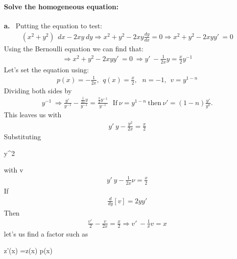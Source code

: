 



 \begin{enumerate}
  \textbf{Solve the homogeneous equation:
  \\\\
  a. }
  \ Putting the equation to test:
  \begin{align}
      (x^{2}+y^{2})\ \ dx-2xy\ dy \Rightarrow x^2+y^2-2xy\frac{dy}{dx}=0  \Rightarrow
      x^2+y^2-2xyy'\:=0
  \end{align}
  Using the Bernoulli equation we can find that:
  \begin{align}
      \Rightarrow  x^2+y^2-2xyy'\:=0 \ \Rightarrow 
  y'\:-\frac{1}{2x}y=\frac{x}{2}y^{-1} 
  \end{align}
  Let’s set the equation using:
  \begin{align}
      p\left(x\right)=-\frac{1}{2x}, \ \ q\left(x\right)=\frac{x}{2},\: \ \
  n=-1,  \ \ v=y^{1-n}
  \end{align}
  Dividing both sides by
  \begin{align}
      y^{-1} \ \Rightarrow 
  \frac{y'\:}{y^{-1}}-\frac{\frac{1}{2x}y}{y^{-1}}=\frac{\frac{x}{2}y^{-1}}{y^{-1}} \ \ \
  \mathrm{If\:}\nu =y^{1-n}\mathrm{\:then\:}\nu '=\left(1-n\right)\frac{y'}{y^n}.
  \end{align}
  This leaves us  with
  \begin{align}
  y'\:y-\frac{y^2}{2x}=\frac{x}{2}
  \end{align}
  Substituting 
  \begin{justify}
  y^2
  \end{justify}
   with v
  \begin{align}
  y'\:y-\frac{1}{2x}ν=\frac{x}{2}
  \end{align}
  If
  \begin{align}
  \frac{d}{dy}[v] = 2yy'
  \end{align}
  Then
  \begin{align}
  \frac{v'\:}{2}-\frac{v}{2x}=\frac{x}{2} \Rightarrow v'\:-\frac{1}{x}v=x
  \end{align}
  let’s us find a factor such as 
  \begin{center}
  z'(x) =z(x) p(x)
  \end{center}

\end{enumerate}

